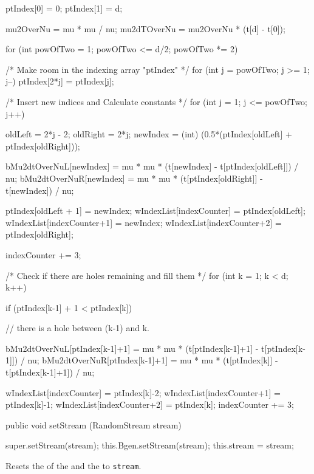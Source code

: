 \begin{code}
\begin{hide}
{{        ptIndex[0] = 0;
        ptIndex[1] = d;

        mu2OverNu   = mu * mu / nu;
        mu2dTOverNu = mu2OverNu * (t[d] - t[0]);

        for (int powOfTwo = 1; powOfTwo <= d/2; powOfTwo *= 2) {
            /* Make room in the indexing array "ptIndex" */
            for (int j = powOfTwo; j >= 1; j--) { ptIndex[2*j] = ptIndex[j]; }

            /* Insert new indices and Calculate constants */
            for (int j = 1; j <= powOfTwo; j++) {
                oldLeft  = 2*j - 2;
                oldRight = 2*j;
                newIndex = (int) (0.5*(ptIndex[oldLeft] + ptIndex[oldRight]));

                bMu2dtOverNuL[newIndex] = mu * mu
                                   * (t[newIndex] - t[ptIndex[oldLeft]]) / nu;
                bMu2dtOverNuR[newIndex] = mu * mu
                                  * (t[ptIndex[oldRight]] - t[newIndex]) / nu;

                ptIndex[oldLeft + 1]       = newIndex;
                wIndexList[indexCounter]   = ptIndex[oldLeft];
                wIndexList[indexCounter+1] = newIndex;
                wIndexList[indexCounter+2] = ptIndex[oldRight];

                indexCounter += 3;
            }
        }
        /* Check if there are holes remaining and fill them */
        for (int k = 1; k < d; k++) {
            if (ptIndex[k-1] + 1 < ptIndex[k]) {
            // there is a hole between (k-1) and k.

                bMu2dtOverNuL[ptIndex[k-1]+1] = mu * mu
                                  * (t[ptIndex[k-1]+1] - t[ptIndex[k-1]]) / nu;
                bMu2dtOverNuR[ptIndex[k-1]+1] = mu * mu
                                  * (t[ptIndex[k]] - t[ptIndex[k-1]+1]) / nu;

                wIndexList[indexCounter]   = ptIndex[k]-2;
                wIndexList[indexCounter+1] = ptIndex[k]-1;
                wIndexList[indexCounter+2] = ptIndex[k];
                indexCounter += 3;
            }
        }
        }
    }\end{hide}

   public void setStream (RandomStream stream)\begin{hide} {
        super.setStream(stream);
        this.Bgen.setStream(stream);
        this.stream = stream;
}\end{hide}
\end{code}
\begin{tabb}
Resets the 
of the  and
the  to \texttt{stream}.
\end{tabb}
\begin{code}
\begin{hide}
}
\end{hide}
\end{code}

